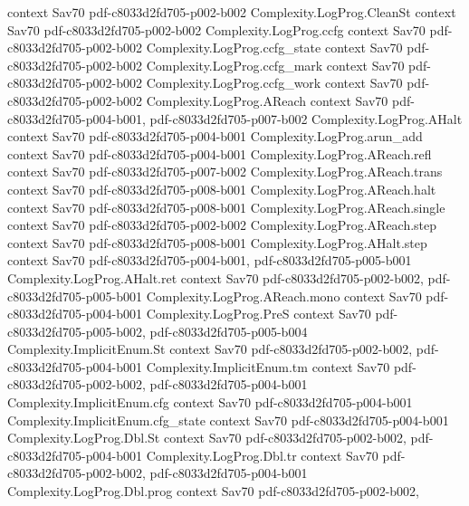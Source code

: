 \begin{theorem}
  {context}
  {Sav70}
  {pdf-c8033d2fd705-p002-b002}
\proofstep
  {Complexity.LogProg.CleanSt}
  {context}
  {Sav70}
  {pdf-c8033d2fd705-p002-b002}
\proofstep
  {Complexity.LogProg.ccfg}
  {context}
  {Sav70}
  {pdf-c8033d2fd705-p002-b002}
\proofstep
  {Complexity.LogProg.ccfg_state}
  {context}
  {Sav70}
  {pdf-c8033d2fd705-p002-b002}
\proofstep
  {Complexity.LogProg.ccfg_mark}
  {context}
  {Sav70}
  {pdf-c8033d2fd705-p002-b002}
\proofstep
  {Complexity.LogProg.ccfg_work}
  {context}
  {Sav70}
  {pdf-c8033d2fd705-p002-b002}
\proofstep
  {Complexity.LogProg.AReach}
  {context}
  {Sav70}
  {pdf-c8033d2fd705-p004-b001,
    pdf-c8033d2fd705-p007-b002}
\proofstep
  {Complexity.LogProg.AHalt}
  {context}
  {Sav70}
  {pdf-c8033d2fd705-p004-b001}
\proofstep
  {Complexity.LogProg.arun_add}
  {context}
  {Sav70}
  {pdf-c8033d2fd705-p004-b001}
\proofstep
  {Complexity.LogProg.AReach.refl}
  {context}
  {Sav70}
  {pdf-c8033d2fd705-p007-b002}
\proofstep
  {Complexity.LogProg.AReach.trans}
  {context}
  {Sav70}
  {pdf-c8033d2fd705-p008-b001}
\proofstep
  {Complexity.LogProg.AReach.halt}
  {context}
  {Sav70}
  {pdf-c8033d2fd705-p008-b001}
\proofstep
  {Complexity.LogProg.AReach.single}
  {context}
  {Sav70}
  {pdf-c8033d2fd705-p002-b002}
\proofstep
  {Complexity.LogProg.AReach.step}
  {context}
  {Sav70}
  {pdf-c8033d2fd705-p008-b001}
\proofstep
  {Complexity.LogProg.AHalt.step}
  {context}
  {Sav70}
  {pdf-c8033d2fd705-p004-b001,
    pdf-c8033d2fd705-p005-b001}
\proofstep
  {Complexity.LogProg.AHalt.ret}
  {context}
  {Sav70}
  {pdf-c8033d2fd705-p002-b002,
    pdf-c8033d2fd705-p005-b001}
\proofstep
  {Complexity.LogProg.AReach.mono}
  {context}
  {Sav70}
  {pdf-c8033d2fd705-p004-b001}
\proofstep
  {Complexity.LogProg.PreS}
  {context}
  {Sav70}
  {pdf-c8033d2fd705-p005-b002,
    pdf-c8033d2fd705-p005-b004}
\proofstep
  {Complexity.ImplicitEnum.St}
  {context}
  {Sav70}
  {pdf-c8033d2fd705-p002-b002,
    pdf-c8033d2fd705-p004-b001}
\proofstep
  {Complexity.ImplicitEnum.tm}
  {context}
  {Sav70}
  {pdf-c8033d2fd705-p002-b002,
    pdf-c8033d2fd705-p004-b001}
\proofstep
  {Complexity.ImplicitEnum.cfg}
  {context}
  {Sav70}
  {pdf-c8033d2fd705-p004-b001}
\proofstep
  {Complexity.ImplicitEnum.cfg_state}
  {context}
  {Sav70}
  {pdf-c8033d2fd705-p004-b001}
\proofstep
  {Complexity.LogProg.Dbl.St}
  {context}
  {Sav70}
  {pdf-c8033d2fd705-p002-b002,
    pdf-c8033d2fd705-p004-b001}
\proofstep
  {Complexity.LogProg.Dbl.tr}
  {context}
  {Sav70}
  {pdf-c8033d2fd705-p002-b002,
    pdf-c8033d2fd705-p004-b001}
\proofstep
  {Complexity.LogProg.Dbl.prog}
  {context}
  {Sav70}
  {pdf-c8033d2fd705-p002-b002,
}
\end{theorem}
